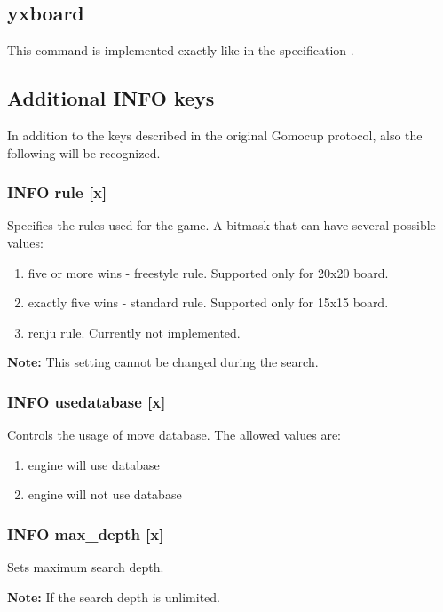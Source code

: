 \documentclass[12pt,a4paper]{article}
\begin{document}
\subsection{yxboard}
\label{cmd_yxboard}
This command is implemented exactly like in the specification \cite{yixinboard}.


\subsection{Additional INFO keys}
\label{cmd_ysinfo_extension1}
In addition to the keys described in the original Gomocup protocol, also the following will be recognized.

\subsubsection{INFO rule [x]}
\label{cmd_yxinfo_rule}
Specifies the rules used for the game. A bitmask that can have several possible values:
\begin{enumerate}[leftmargin=7.5em]
	\item[\text{$[x]=0$}]{five or more wins - freestyle rule. Supported only for 20x20 board.}
	\item[\text{$[x]=1$}]{exactly five wins - standard rule. Supported only for 15x15 board.}
	\item[\text{$[x]=2$}]{renju rule. Currently not implemented.}
\end{enumerate}

\textbf{Note:} This setting cannot be changed during the search.

\subsubsection{INFO usedatabase [x]}
Controls the usage of move database. The allowed values are:
\begin{enumerate}[leftmargin=7.5em]
	\item[\text{$[x]=0$}]{engine will use database}
	\item[\text{$[x]=1$}]{engine will not use database}
\end{enumerate}

\subsubsection{INFO max{\_}depth [x]}
Sets maximum search depth. 

\textbf{Note:} If  the search depth is unlimited.
\end{document}
